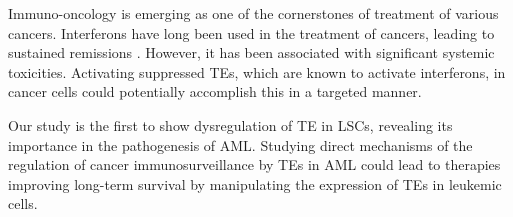 Immuno-oncology is emerging as one of the cornerstones of treatment of various cancers. Interferons have long been used in the treatment of cancers, leading to sustained remissions \cite{Talpaz2013, Ortiz2017, Hasselbalch2011}. However, it has been associated with significant systemic toxicities. Activating suppressed TEs, which are known to activate interferons, in cancer cells could potentially accomplish this in a targeted manner.

Our study is the first to show dysregulation of TE in LSCs, revealing its importance in the pathogenesis of AML. Studying direct mechanisms of the regulation of cancer immunosurveillance by TEs in AML could lead to therapies improving long-term survival by manipulating the expression of TEs in leukemic cells.

